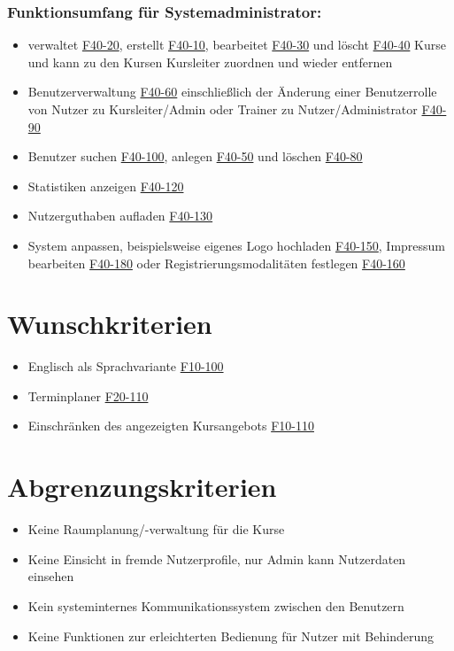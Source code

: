 \documentclass[a4paper]{scrreprt}
\begin{document}
		\subsubsection{Funktionsumfang für Systemadministrator:}
			\begin{itemize}
				\item verwaltet \hyperlink{kursVerwalt}{F40-20}, erstellt \hyperlink{kursErstellen}{F40-10}, bearbeitet \hyperlink{kursBearbeiten}{F40-30} und löscht \hyperlink{kursLoeschen}{F40-40} Kurse und kann zu den Kursen Kursleiter zuordnen \hyperlink{kursKLAdd}{} und wieder entfernen \hyperlink{kursKLDel}{}
				\item Benutzerverwaltung \hyperlink{nutzerVerwalt}{F40-60} einschließlich der Änderung einer Benutzerrolle von Nutzer zu Kursleiter/\gls{Admin} oder \gls{Trainer} zu Nutzer/Administrator \hyperlink{nutzerRolle}{F40-90}
				\item Benutzer suchen \hyperlink{nutzerSuchen}{F40-100}, anlegen \hyperlink{nutzerAnlegen}{F40-50} und löschen \hyperlink{nutzerLoeschen}{F40-80}
				\item Statistiken anzeigen \hyperlink{statistik}{F40-120}
				\item Nutzerguthaben aufladen \hyperlink{guthabenAuf}{F40-130}
				\item System anpassen, beispielsweise eigenes Logo hochladen \hyperlink{logo}{F40-150}, Impressum bearbeiten \hyperlink{impressumBea}{F40-180} oder Registrierungsmodalitäten festlegen \hyperlink{regMod}{F40-160}
			\end{itemize}
			
    \section{Wunschkriterien}
			\begin{itemize}
				\item Englisch als Sprachvariante \hyperlink{spracheAendern}{F10-100}
				\item Terminplaner \hyperlink{terminplaner}{F20-110}
	     		\item Einschränken des angezeigten Kursangebots \hyperlink{kursEinschraenken}{F10-110}
			\end{itemize}
			
	\section{Abgrenzungskriterien}
     		\begin{itemize}
	     		\item Keine Raumplanung/-verwaltung für die Kurse
	     		\item Keine Einsicht in fremde Nutzerprofile, nur Admin kann Nutzerdaten einsehen
	     		\item Kein systeminternes Kommunikationssystem zwischen den Benutzern
	     		\item Keine Funktionen zur erleichterten Bedienung für Nutzer mit Behinderung
     		\end{itemize}
        
\end{document}
